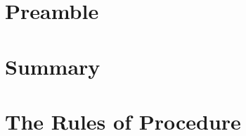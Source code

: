 \documentclass[a4paper,10pt]{article}
\begin{document}
 \tableofcontents
%	 
  \section[Motivation]{Preamble}
		
	\section{Summary}
		\newpage
  \section{The Rules of Procedure}
		
%	 
 \label{theEnd}
\end{document}
